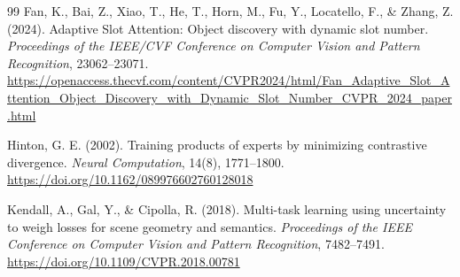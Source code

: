 \documentclass[12pt,a4paper]{article}
\begin{document}
\begin{thebibliography}{99}
Fan, K., Bai, Z., Xiao, T., He, T., Horn, M., Fu, Y., Locatello, F., \& Zhang, Z. (2024).
Adaptive Slot Attention: Object discovery with dynamic slot number.
\textit{Proceedings of the IEEE/CVF Conference on Computer Vision and Pattern Recognition}, 23062--23071.
\url{https://openaccess.thecvf.com/content/CVPR2024/html/Fan_Adaptive_Slot_Attention_Object_Discovery_with_Dynamic_Slot_Number_CVPR_2024_paper.html}

Hinton, G. E. (2002).
Training products of experts by minimizing contrastive divergence.
\textit{Neural Computation}, 14(8), 1771--1800.
\url{https://doi.org/10.1162/089976602760128018}

Kendall, A., Gal, Y., \& Cipolla, R. (2018).
Multi-task learning using uncertainty to weigh losses for scene geometry and semantics.
\textit{Proceedings of the IEEE Conference on Computer Vision and Pattern Recognition}, 7482--7491.
\url{https://doi.org/10.1109/CVPR.2018.00781}

\end{thebibliography}
\end{document}
